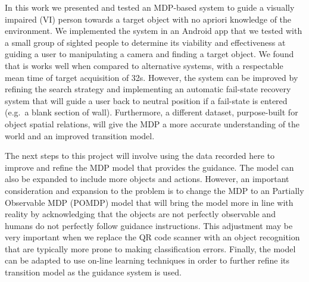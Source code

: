 \documentclass[a4paper, twoside]{article}
\begin{document}
\noindent In this work we presented and tested an MDP-based system to guide a visually impaired (VI) person towards a target object with no apriori knowledge of the environment. We implemented the system in an Android app that we tested with a small group of sighted people to determine its viability and effectiveness at guiding a user to manipulating a camera and finding a target object. We found that is works well when compared to alternative systems, with a respectable mean time of target acquisition of 32s. However, the system can be improved by refining the search strategy and implementing an automatic fail-state recovery system that will guide a user back to neutral position if a fail-state is entered (e.g.\ a blank section of wall). Furthermore, a different dataset, purpose-built for object spatial relations, will give the MDP a more accurate understanding of the world and an improved transition model.

The next steps to this project will involve using the data recorded here to improve and refine the MDP model that provides the guidance. The model can also be expanded to include more objects and actions. However, an important consideration and expansion to the problem is to change the MDP to an Partially Observable MDP (POMDP) model that will bring the model more in line with reality by acknowledging that the objects are not perfectly observable and humans do not perfectly follow guidance instructions. This adjustment may be very important when we replace the QR code scanner with an object recognition that are typically more prone to making classification errors. Finally, the model can be adapted to use on-line learning techniques in order to further refine its transition model as the guidance system is used.  


{\small
}
\end{document}
